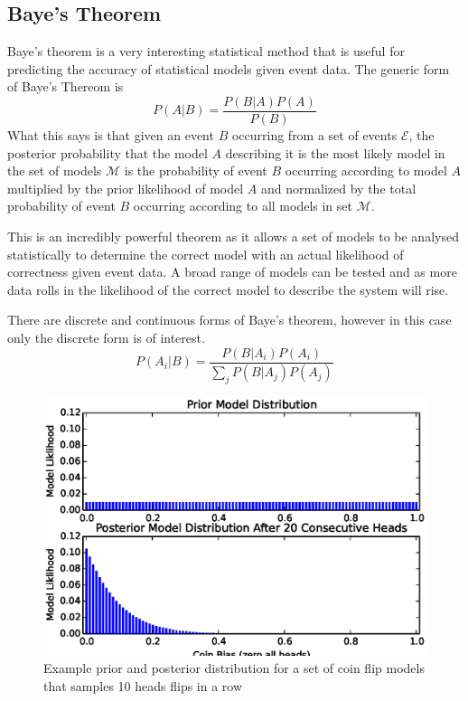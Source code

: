 \subsection{Baye's Theorem} 
Baye's theorem is a very interesting statistical method that is useful for predicting the accuracy of statistical models given event data. The generic form of Baye's Thereom is 
\begin{equation}
P(A|B) = \frac{P(B|A)P(A)}{P(B)} 
\label{eq:bayes}
\end{equation}
What this says is that given an event $B$ occurring from a set of events $\mathcal{E}$, the posterior probability that the model $A$ describing it is the most likely model in the set of models $\mathcal{M}$ is the probability of event $B$ occurring according to model $A$ multiplied by the prior likelihood of model $A$ and normalized by the total probability of event $B$ occurring according to all models in set $\mathcal{M}$.\cite{bayes}

This is an incredibly powerful theorem as it allows a set of models to be analysed statistically to determine the correct model with an actual likelihood of correctness given event data. A broad range of models can be tested and as more data rolls in the likelihood of the correct model to describe the system will rise.

There are discrete and continuous forms of Baye's theorem, however in this case only the discrete form is of interest. 
\begin{equation}
P(A_i|B) = \frac{P(B|A_i)P(A_i)}{\sum \limits_j P(B|A_j)P(A_j)}
\label{eq:discretebayes}
\end{equation}
\begin{figure}[ht!]
\centering
\includegraphics[scale=0.5]{Figures/bayes.eps}
\caption{Example prior and posterior distribution for a set of coin flip models that samples 10 heads flips in a row}
\label{fig:bayes}
\end{figure}

